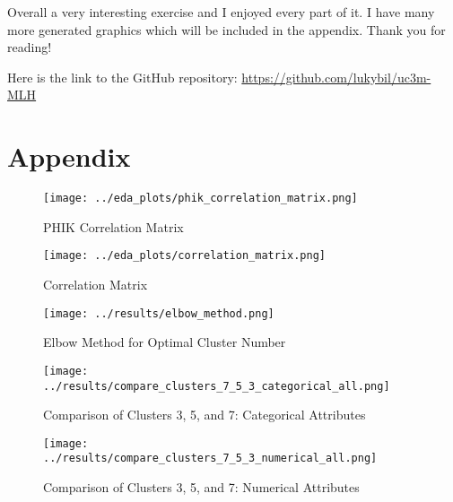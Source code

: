 \documentclass[a4paper,12pt]{article}
\begin{document}
Overall a very interesting exercise and I enjoyed every part of it. I have many more generated graphics which will be included in the appendix. Thank you for reading!

\vspace{1cm}
Here is the link to the GitHub repository: \url{https://github.com/lukybil/uc3m-MLH}

\newpage
\appendix
\section*{Appendix}

\begin{figure}[h]
  \centering
  \texttt{[image: ../eda\_plots/phik\_correlation\_matrix.png]}
  \caption{PHIK Correlation Matrix}
\end{figure}

\begin{figure}[h]
  \centering
  \texttt{[image: ../eda\_plots/correlation\_matrix.png]}
  \caption{Correlation Matrix}
\end{figure}

\begin{figure}[h]
  \centering
  \texttt{[image: ../results/elbow\_method.png]}
  \caption{Elbow Method for Optimal Cluster Number}
\end{figure}

\begin{figure}[h]
  \centering
  \texttt{[image: ../results/compare\_clusters\_7\_5\_3\_categorical\_all.png]}
  \caption{Comparison of Clusters 3, 5, and 7: Categorical Attributes}
\end{figure}

\begin{figure}[h]
  \centering
  \texttt{[image: ../results/compare\_clusters\_7\_5\_3\_numerical\_all.png]}
  \caption{Comparison of Clusters 3, 5, and 7: Numerical Attributes}
\end{figure}
\end{document}

